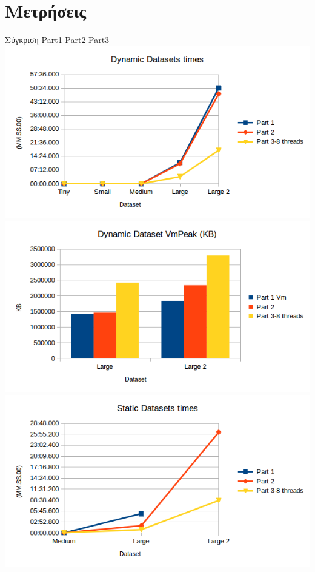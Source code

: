 \documentclass[12pt]{article}
\begin{document}
\section{Μετρήσεις}
Σύγκριση Part1 Part2 Part3\\
\includegraphics[scale=0.5]{DynamicDatasets_times.png}
\includegraphics[scale=0.5]{DynamicDatasets_VmPeak.png}\\
\includegraphics[scale=0.5]{StaticDatasets_times.png}
\end{document}
